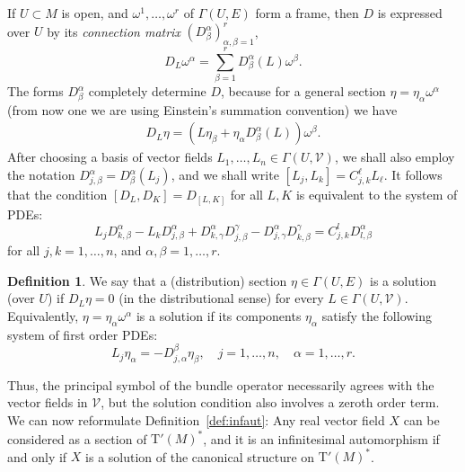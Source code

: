 \documentclass[11pt]{amsart}
\newcommand{\holforms}{\mathrm{T}'}
\theoremstyle{definition}
\newtheorem{defn}{Definition}[section]
\theoremstyle{remark}
\theoremstyle{plain}
\begin{document}
%
If $U\subset M$ is open, and $\omega^1, \dots, \omega^r$ of $\Gamma(U,E)$ form a frame, 
then $D$ is expressed over $U$ by its {\em connection matrix} $(D^\alpha_\beta)_{\alpha,\beta=1}^r$,  
\[ D_{L} \omega^\alpha = \sum_{\beta= 1}^r  D^\alpha_{\beta} (L) \omega^\beta.\]
The  forms $D^\alpha_{\beta}$ completely determine $D$, because for a
general section $\eta = \eta_\alpha \omega^\alpha$ (from now one we are using Einstein's summation convention) we have 
\[ \begin{aligned}
D_{L} \eta =  (L \eta_\beta  +  \eta_\alpha D^\alpha_\beta (L)) \omega^\beta.
\end{aligned} \]
%
After choosing a basis of vector fields $L_1, \dots, L_n \in \Gamma(U, \mathcal{V})$, we  shall also employ the notation
$D^\alpha_{j,\beta} = D^\alpha_\beta (L_j)$, and we shall write $[L_j, L_k] = C_{j,k}^\ell L_\ell$. It follows that the condition $[D_{ L}, D_{ K}] = D_{[ L,  K]}$ for all $ L,  K$ is equivalent to the
system of PDEs:
%
\begin{equation}\label{e:compatibilitycondition}
	 L_j D^\alpha_{k, \beta}  - 
	 L_k D^\alpha_{j, \beta}  
	+ D^\alpha_{k,\gamma} D^\gamma_{j,\beta}  - 
	D^\alpha_{j,\gamma} D^\gamma_{k,\beta} = C_{j,k}^l D^\alpha_{l,\beta} 
\end{equation}
%
for all $j,k = 1,\dots,n$, and $\alpha,\beta = 1,\dots, r$.
%
\begin{defn}
We say that a (distribution) section $\eta\in \Gamma(U,E)$ is a solution (over $U$) if $D_{ L} \eta =0$ (in the distributional sense) for every $ L \in \Gamma(U,\mathcal{V})$. Equivalently, $\eta = \eta_\alpha\omega^\alpha $ is a solution if its components
$\eta_\alpha$ satisfy the following system of first order PDEs:
\[ L_j \eta_\alpha = - D_{j,\alpha}^\beta  \eta_\beta, \quad j=1,\dots, n, \quad \alpha=1,\dots,r.\] 	
\end{defn}
Thus, the principal symbol of the bundle operator necessarily agrees with the vector fields in $\mathcal{V}$, but the solution condition also involves a zeroth order term. 
%
We can now reformulate Definition~\ref{def:infaut}: Any real vector field $X$ can be considered
as a section of $\holforms(M)^*$, and it is an infinitesimal automorphism if and only if $X$ is a solution of the canonical
structure on $\holforms(M)^*$. 
%
%
\end{document}
